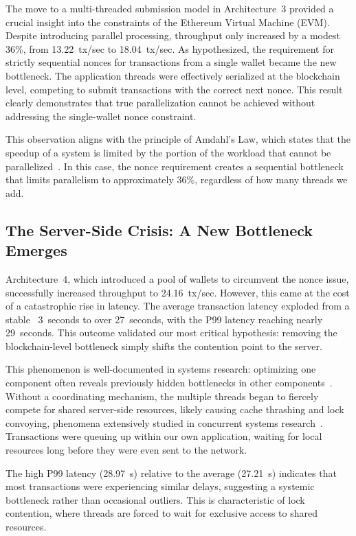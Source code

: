 The move to a multi-threaded submission model in Architecture~3 provided a crucial insight into the constraints of the Ethereum Virtual Machine (EVM). Despite introducing parallel processing, throughput only increased by a modest 36\%, from 13.22~tx/sec to 18.04~tx/sec. As hypothesized, the requirement for strictly sequential nonces for transactions from a single wallet became the new bottleneck. The application threads were effectively serialized at the blockchain level, competing to submit transactions with the correct next nonce. This result clearly demonstrates that true parallelization cannot be achieved without addressing the single-wallet nonce constraint.

This observation aligns with the principle of Amdahl's Law, which states that the speedup of a system is limited by the portion of the workload that cannot be parallelized~\cite{amdahl1967validity}. In this case, the nonce requirement creates a sequential bottleneck that limits parallelism to approximately 36\%, regardless of how many threads we add.

\subsection{The Server-Side Crisis: A New Bottleneck Emerges}

Architecture~4, which introduced a pool of wallets to circumvent the nonce issue, successfully increased throughput to 24.16~tx/sec. However, this came at the cost of a catastrophic rise in latency. The average transaction latency exploded from a stable ~3~seconds to over 27~seconds, with the P99 latency reaching nearly 29~seconds. This outcome validated our most critical hypothesis: removing the blockchain-level bottleneck simply shifts the contention point to the server.

This phenomenon is well-documented in systems research: optimizing one component often reveals previously hidden bottlenecks in other components~\cite{barroso2003web}. Without a coordinating mechanism, the multiple threads began to fiercely compete for shared server-side resources, likely causing cache thrashing and lock convoying, phenomena extensively studied in concurrent systems research~\cite{moir2018concurrent}. Transactions were queuing up within our own application, waiting for local resources long before they were even sent to the network.

The high P99 latency (28.97~s) relative to the average (27.21~s) indicates that most transactions were experiencing similar delays, suggesting a systemic bottleneck rather than occasional outliers. This is characteristic of lock contention, where threads are forced to wait for exclusive access to shared resources.

